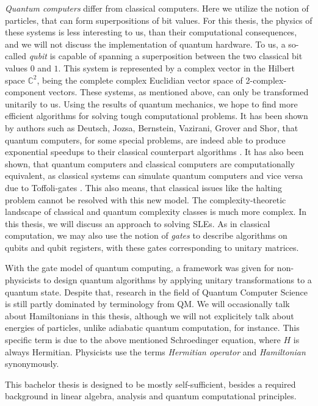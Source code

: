 \emph{Quantum computers} differ from classical computers. Here we utilize the notion of particles, that can form superpositions of bit values. For this thesis, the physics of these systems is less interesting to us, than their computational consequences, and we will not discuss the implementation of quantum hardware. To us, a so-called \emph{qubit} is capable of spanning a superposition between the two classical bit values \(0\) and \(1\). This system is represented by a complex vector in the Hilbert space \(\mathbb{C}^2\), being the complete complex Euclidian vector space of 2-complex-component vectors. These systems, as mentioned above, can only be transformed unitarily to us. Using the results of quantum mechanics, we hope to find more efficient algorithms for solving tough computational problems. It has been shown by authors such as Deutsch, Jozsa, Bernstein, Vazirani, Grover and Shor, that quantum computers, for some special problems, are indeed able to produce exponential speedups to their classical counterpart algorithms \cite{Nielsen2010}. It has also been shown, that quantum computers and classical computers are computationally equivalent, as classical systems can simulate quantum computers and vice versa due to Toffoli-gates \cite[p. 29 f.]{Nielsen2010}. This also means, that classical issues like the halting problem cannot be resolved with this new model. The complexity-theoretic landscape of classical and quantum complexity classes is much more complex. In this thesis, we will discuss an approach to solving SLEs. As in classical computation, we may also use the notion of \emph{gates} to describe algorithms on qubits and qubit registers, with these gates corresponding to unitary matrices.

\phantom{}

With the gate model of quantum computing, a framework was given for non-physicists to design quantum algorithms by applying unitary transformations to a quantum state. Despite that, research in the field of Quantum Computer Science is still partly dominated by terminology from QM. We will occasionally talk about Hamiltonians in this thesis, although we will not explicitely talk about energies of particles, unlike adiabatic quantum computation, for instance. This specific term is due to the above mentioned Schroedinger equation, where \(H\) is always Hermitian. Physicists use the terms \emph{Hermitian operator} and \emph{Hamiltonian} synonymously.

\phantom{}

This bachelor thesis is designed to be mostly self-sufficient, besides a required background in linear algebra, analysis and quantum computational principles.

